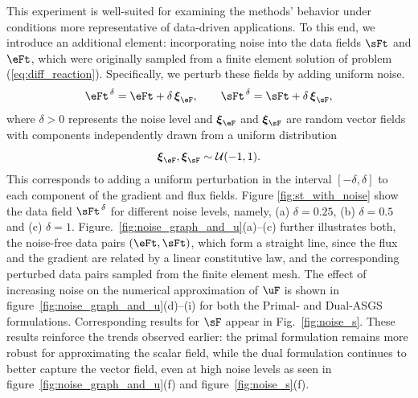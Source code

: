 This experiment is well-suited for examining the methods' behavior under conditions more representative of data-driven applications. To this end, we introduce an additional element: incorporating noise into the data fields $\sFt$ and $\eFt$, which were originally sampled from a finite element solution of problem (\ref{eq:diff_reaction}). Specifically, we perturb these fields by adding uniform noise.
\begin{equation}
	\eFt^{\,\delta} = \eFt + \delta\,\boldsymbol{\xi}_{\eF},
	\qquad
	\sFt^{\,\delta} = \sFt + \delta\,\boldsymbol{\xi}_{\sF},
\end{equation}
where $\delta > 0$ represents the noise level and $\boldsymbol{\xi}_{\eF}$ and $\boldsymbol{\xi}_{\sF}$ are random vector fields with components independently drawn from a uniform distribution
\begin{equation}
	\boldsymbol{\xi}_{\eF}, \boldsymbol{\xi}_{\sF} \sim \mathcal{U}(-1,1).
\end{equation}
This corresponds to adding a uniform perturbation in the interval $[-\delta, \delta]$ to each component of the gradient and flux fields. Figure \ref{fig:st_with_noise} show the data field $\sFt^{\,\delta}$ for different noise levels, namely, (a) $\delta=0.25$, (b) $\delta=0.5$ and
(c) $\delta=1$. Figure.~\ref{fig:noise_graph_and_u}(a)--(c) further illustrates
both, the noise-free data pairs $(\eFt,\sFt)$, which form a straight line, since the flux and the gradient are related by a linear constitutive law, and the corresponding perturbed data pairs sampled from the finite element mesh.
The effect of increasing noise on the numerical approximation of $\uF$ is shown in figure~\ref{fig:noise_graph_and_u}(d)–(i) for both the Primal- and Dual-ASGS formulations. Corresponding results for $\sF$ appear in Fig.~\ref{fig:noise_s}. These results reinforce the trends observed earlier: the primal formulation remains more robust for approximating the scalar field, while the dual formulation continues to better capture the vector field, even at high noise levels as seen in figure~\ref{fig:noise_graph_and_u}(f) and figure~\ref{fig:noise_s}(f). 

